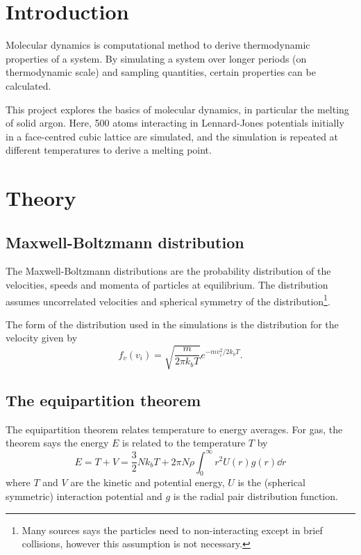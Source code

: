 \documentclass[fleqn]{scrartcl}
\begin{document}
	\title{}
	\subtitle{\url{https://github.com/sverl/FYS3150-FYS4150}}
	\author{Sverre Løyland}
	\maketitle
	
	\begin{abstract}
		
	\end{abstract}

	\section{Introduction}
	Molecular dynamics is computational method to derive thermodynamic properties of a system. By simulating a system over longer periods (on thermodynamic scale) and sampling quantities, certain properties can be calculated.
	
	This project explores the basics of molecular dynamics, in particular the melting of solid argon. Here, 500  atoms interacting in Lennard-Jones potentials initially in a face-centred cubic lattice are simulated, and the simulation is repeated at different temperatures to derive a melting point.
	
	\section{Theory}
	\subsection{Maxwell-Boltzmann distribution}
	The Maxwell-Boltzmann distributions are the probability distribution of the velocities, speeds and momenta of particles at equilibrium. The distribution assumes uncorrelated velocities and spherical symmetry of the distribution\footnote{Many sources says the particles need to non-interacting except in brief collisions, however this assumption is not necessary.}.
	
	The form of the distribution used in the simulations is the distribution for the velocity given by
	\begin{equation}
		f_v(v_i) = \sqrt{\frac{m}{2\pi k_bT}}e^{-mv_i^2/2k_bT}.
	\end{equation}
	\subsection{The equipartition theorem}
	The equipartition theorem relates temperature to energy averages. For gas, the theorem says the energy $E$ is related to the temperature $T$ by
	\begin{equation}
		E = T + V = \frac32 Nk_bT+2\pi N\rho\int_0^\infty r^2U(r)g(r)\dd{r}
	\end{equation}
	where $T$ and $V$ are the kinetic and potential energy, $U$ is the (spherical symmetric) interaction potential and $g$ is the radial pair distribution function. 
	
\end{document}
